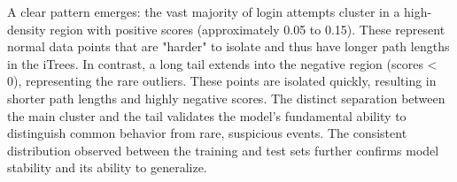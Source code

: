 \documentclass[conference]{IEEEtran}
\begin{document}
A clear pattern emerges: the vast majority of login attempts cluster in a high-density region with positive scores (approximately 0.05 to 0.15). These represent normal data points that are "harder" to isolate and thus have longer path lengths in the iTrees. In contrast, a long tail extends into the negative region (scores < 0), representing the rare outliers. These points are isolated quickly, resulting in shorter path lengths and highly negative scores. The distinct separation between the main cluster and the tail validates the model's fundamental ability to distinguish common behavior from rare, suspicious events. The consistent distribution observed between the training and test sets further confirms model stability and its ability to generalize.

\begin{figure}[t!]
    \centering
    \\

\end{figure}
\end{document}
